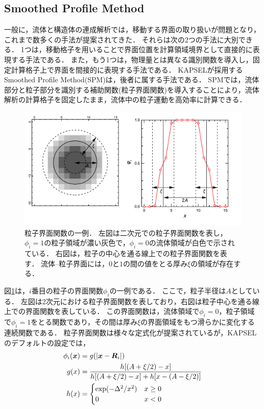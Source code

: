 \documentclass[pdflatex,a4paper,10pt,ja=standard]{bxjsarticle}
\def\vec#1{\mbox{\boldmath $#1$}}
\begin{document}
\subsection{Smoothed Profile Method}
\label{sec:spm}
一般に，流体と構造体の連成解析では，移動する界面の取り扱いが問題となり，これまで数多くの手法が提案されてきた\autocite{kobayashi2003cfd,jsces2017fem}．
それらは次の2つの手法に大別できる．
1つは，移動格子を用いることで界面位置を計算領域境界として直接的に表現する手法である．
また，もう1つは，物理量とは異なる識別関数を導入し，固定計算格子上で界面を間接的に表現する手法である．
KAPSELが採用するSmoothed Profile Method(SPM)\autocite{nakayama2005simulation,iwashita2008numerical,iwashita2009short,kobayashi2011implementation,molina2016rheological}は，後者に属する手法である．
SPMでは，流体部分と粒子部分を識別する補助関数(粒子界面関数)を導入することにより，流体解析の計算格子を固定したまま，流体中の粒子運動を高効率に計算できる．
\begin{figure}[htbp]
    \centering
    \includegraphics[width=12truecm]{phi.pdf}
    \caption{粒子界面関数の一例．
    左図は二次元での粒子界面関数を表し，$\phi_{i} =1$の粒子領域が濃い灰色で，$\phi_{i} =0$の流体領域が白色で示されている．
    右図は，粒子の中心を通る線上での粒子界面関数を表す．
    流体--粒子界面には，$0$と$1$の間の値をとる厚み$\xi$の領域が存在する．}
    \label{fig:phi}
\end{figure}
図\ref{fig:phi}は，$i$番目の粒子の界面関数$\phi_{i}$の一例である．
ここで，粒子半径は$A$としている．
左図は2次元における粒子界面関数を表しており，右図は粒子中心を通る線上での界面関数を表している．
この界面関数は，流体領域で$\phi_{i} = 0$，粒子領域で$\phi_{i} = 1$をとる関数であり，その間は厚み$\xi$の界面領域をもつ滑らかに変化する連続関数である．
粒子界面関数は様々な定式化が提案されている\autocite{nakayama2005simulation}が，KAPSELのデフォルトの設定では，
\begin{align}
    \phi_{i}(\vec{x}) &= g(|\vec{x} - \vec{R}_{i}|) \\
    g(x) &=  \frac{h[(A+\xi/2)-x]}{h[(A+\xi/2)-x] + h[x - (A -\xi/2)]} \\
    h(x) &= \begin{cases}
    \exp(-\Delta^2/x^2) & x \geq 0 \\
    0 & x < 0
    \end{cases}
\end{align}
\end{document}
